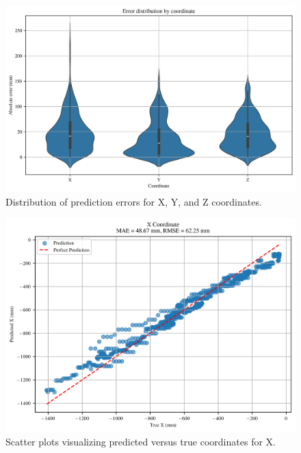 \documentclass[]{spie}  %
\begin{document}
	\lipsum[1]
	
	\begin{figure}[H]
		\centering
		\includegraphics[width=6.5in]{figures/Figure4_Error_Distribution}
		\caption{Distribution of prediction errors for X, Y, and Z coordinates.}
		\label{fig:Figure4_Error_Distribution}
	\end{figure}
	
		\lipsum[1-2]
	
	\begin{figure}[H]
		\centering
		\includegraphics[width=6.5in]{figures/Figure5_Scatter_X}
		\caption{Scatter plots visualizing predicted versus true coordinates for X.}
		\label{fig:Figure5_Scatter_X}
	\end{figure}
	
\end{document}
